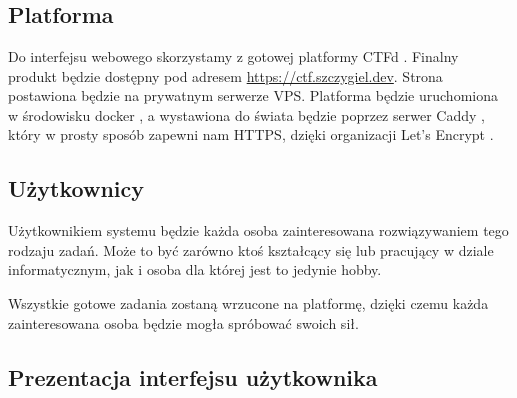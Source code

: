 \documentclass[polish,12pt]{aghthesis}
\begin{document}
\section{\SectionTitleScope}
\label{sec:zakres-funkcjonalnosci}

\subsection{Platforma}

Do interfejsu webowego skorzystamy z gotowej platformy CTFd \cite{CTFd}.
Finalny produkt będzie dostępny pod adresem
\href{https://ctf.szczygiel.dev}{https://ctf.szczygiel.dev}.
Strona postawiona będzie na prywatnym serwerze VPS. Platforma będzie
uruchomiona w środowisku docker \cite{docker},
a wystawiona do świata będzie poprzez serwer Caddy \cite{Caddy},
który w prosty sposób zapewni nam HTTPS, dzięki organizacji Let's Encrypt \cite{lets_encrypt}.

\subsection{Użytkownicy}

Użytkownikiem systemu będzie każda osoba zainteresowana rozwiązywaniem
tego rodzaju zadań. Może to być zarówno ktoś kształcący się lub pracujący
w dziale informatycznym, jak i osoba dla której jest to jedynie hobby.

Wszystkie gotowe zadania zostaną wrzucone na platformę, dzięki czemu
każda zainteresowana osoba będzie mogła spróbować swoich sił.

\clearpage

\subsection{Prezentacja interfejsu użytkownika}
\end{document}
